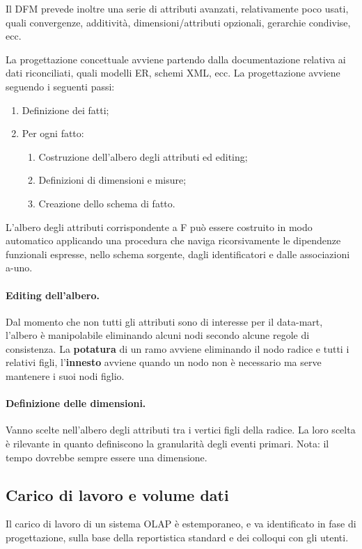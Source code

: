 \documentclass[a4paper, 10pt]{article}
\begin{document}
	Il DFM prevede inoltre una serie di attributi avanzati, relativamente poco usati, quali convergenze, additività, dimensioni/attributi opzionali, gerarchie condivise, ecc.
	
	La progettazione concettuale avviene partendo dalla documentazione relativa ai dati riconciliati, quali modelli ER, schemi XML, ecc. La progettazione avviene seguendo i seguenti passi: \begin{enumerate}
		\item Definizione dei fatti;
		\item Per ogni fatto: \begin{enumerate}
			\item Costruzione dell'albero degli attributi ed editing;
			\item Definizioni di dimensioni e misure;
			\item Creazione dello schema di fatto.
		\end{enumerate}
	\end{enumerate}
	
	L’albero degli attributi corrispondente a F può essere costruito in modo automatico applicando una procedura che naviga ricorsivamente le dipendenze funzionali espresse, nello schema sorgente, dagli identificatori e dalle associazioni a-uno.
	
	\paragraph{Editing dell'albero.} Dal momento che non tutti gli attributi sono di interesse per il data-mart, l'albero è manipolabile eliminando alcuni nodi secondo alcune regole di consistenza. La \textbf{potatura} di un ramo avviene eliminando il nodo radice e tutti i relativi figli, l'\textbf{innesto} avviene quando un nodo non è necessario ma serve mantenere i suoi nodi figlio.
	
	\paragraph{Definizione delle dimensioni.} Vanno scelte nell'albero degli attributi tra i vertici figli della radice. La loro scelta è rilevante in quanto definiscono la granularità degli eventi primari. Nota: il tempo dovrebbe sempre essere una dimensione.
	
	\subsection{Carico di lavoro e volume dati}
	Il carico di lavoro di un sistema OLAP è estemporaneo, e va identificato in fase di progettazione, sulla base della reportistica standard e dei colloqui con gli utenti.
	
\end{document}
